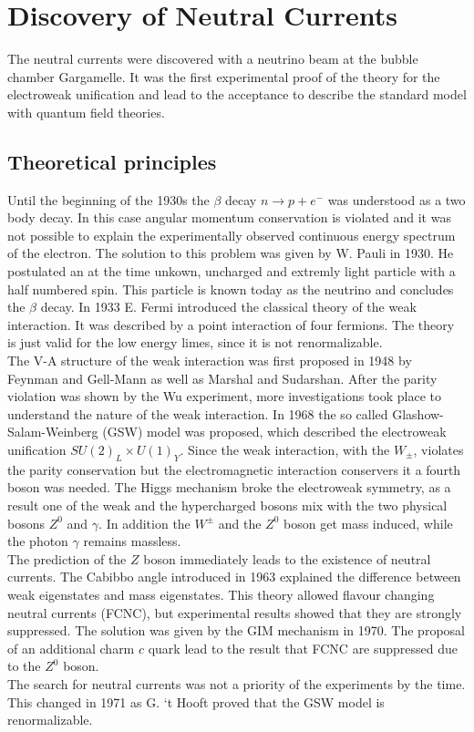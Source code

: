 \section{Discovery of Neutral Currents \cite{NC}}
The neutral currents were discovered with a neutrino beam at the bubble chamber Gargamelle. It was the first experimental proof of the theory for the electroweak unification and lead to the acceptance to describe the standard model with quantum field theories.
\subsection{Theoretical principles}
Until the beginning of the 1930s the $\beta$ decay $n\rightarrow p + e^{-}$ was understood as a two body decay. In this case angular momentum conservation is violated and it was not possible to explain the experimentally observed continuous energy spectrum of the electron. The solution to this problem was given by W. Pauli in 1930. He postulated an at the time unkown, uncharged and extremly light particle with a half numbered spin. This particle is known today as the neutrino and concludes the $\beta$ decay. In 1933 E. Fermi introduced the classical theory of the weak interaction. It was described by a point interaction of four fermions. The theory is just valid for the low energy limes, since it is not renormalizable.\\
The V-A structure of the weak interaction was first proposed in 1948 by Feynman and Gell-Mann as well as Marshal and Sudarshan. After the parity violation was shown by the Wu experiment, more investigations took place to understand the nature of the weak interaction. In 1968 the so called Glashow-Salam-Weinberg (GSW) model was proposed, which described the electroweak unification $SU(2)_{L}\times U(1)_{Y}$. Since the weak interaction, with the $W_{\pm}$, violates the parity conservation but the electromagnetic interaction conservers it a fourth boson was needed. The Higgs mechanism broke the electroweak symmetry, as a result one of the weak and the hypercharged bosons mix with the two physical bosons $Z^0$ and $\gamma$. In addition the $W^{\pm}$ and the $Z^0$ boson get mass induced, while the photon $\gamma$ remains massless.\\
The prediction of the $Z$ boson immediately leads to the existence of neutral currents. The Cabibbo angle introduced in 1963 explained the difference between weak eigenstates and mass eigenstates. This theory allowed flavour changing neutral currents (FCNC), but experimental results showed that they are strongly suppressed. The solution was given by the GIM mechanism in 1970. The proposal of an additional charm $c$ quark lead to the result that FCNC are suppressed due to the $Z^0$ boson.\\
The search for neutral currents was not a priority of the experiments by the time. This changed in 1971 as G. `t Hooft proved that the GSW model is renormalizable.
